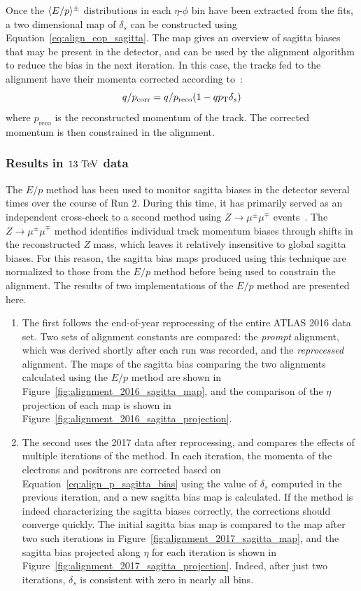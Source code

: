 Once the $\langle E/p\rangle^\pm$ distributions in each $\eta$-$\phi$ bin have been extracted from the fits, a two dimensional map of $\delta_s$ can be constructed using Equation~\ref{eq:align_eop_sagitta}.
The map gives an overview of sagitta biases that may be present in the detector, and can be used by the alignment algorithm to reduce the bias in the next iteration.
In this case, the tracks fed to the alignment have their momenta corrected according to~\cite{2012.alignment-systematics}:
\begin{equation}
q/p_{\textrm{corr}} = q/p_{\textrm{reco}}(1-qp_{\mathrm{T}}\delta_s)
\end{equation}
where $p_{\textrm{reco}}$ is the reconstructed momentum of the track.
The corrected momentum is then constrained in the alignment.

\subsubsection{Results in $13\tev$ data}
The $E/p$ method has been used to monitor sagitta biases in the detector several times over the course of Run 2.
During this time, it has primarily served as an independent cross-check to a second method using $Z\rightarrow\mu^{\pm}\mu^{\mp}$ events~\cite{2012.alignment-systematics}.
The $Z\rightarrow\mu^{\pm}\mu^{\mp}$ method identifies individual track momentum biases through shifts in the reconstructed $Z$ mass, which leaves it relatively insensitive to global sagitta biases.
For this reason, the sagitta bias maps produced using this technique are normalized to those from the $E/p$ method before being used to constrain the alignment. 
The results of two implementations of the $E/p$ method are presented here.
\begin{enumerate}
\item The first follows the end-of-year reprocessing of the entire ATLAS 2016 data set. %
Two sets of alignment constants are compared: the \emph{prompt} alignment, which was derived shortly after each run was recorded, and the \emph{reprocessed} alignment.
The maps of the sagitta bias comparing the two alignments calculated using the $E/p$ method are shown in Figure~\ref{fig:alignment_2016_sagitta_map}, and the comparison of the $\eta$ projection of each map is shown in Figure~\ref{fig:alignment_2016_sagitta_projection}.
\item The second uses the 2017 data after reprocessing, and compares the effects of multiple iterations of the method.
In each iteration, the momenta of the electrons and positrons are corrected based on Equation~\ref{eq:align_p_sagitta_bias} using the value of $\delta_s$ computed in the previous iteration, and a new sagitta bias map is calculated.
If the method is indeed characterizing the sagitta biases correctly, the corrections should converge quickly.
The initial sagitta bias map is compared to the map after two such iterations in Figure~\ref{fig:alignment_2017_sagitta_map}, and the sagitta bias projected along $\eta$ for each iteration is shown in Figure~\ref{fig:alignment_2017_sagitta_projection}.
Indeed, after just two iterations, $\delta_s$ is consistent with zero in nearly all bins.
\end{enumerate}


